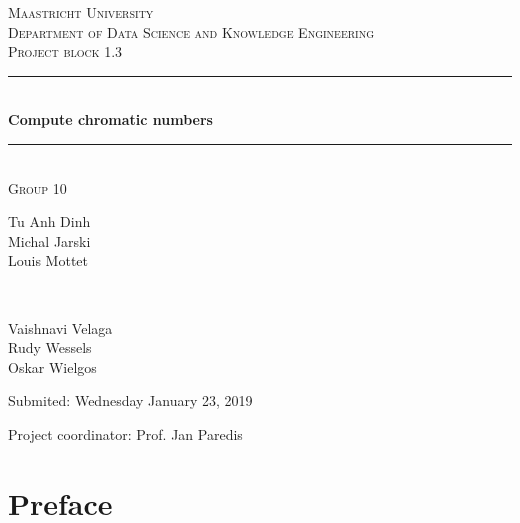 \documentclass[a4paper]{report}
\begin{document}
	\begin{titlepage} 
		\newcommand{\HRule}{\rule{\linewidth}{0.5mm}} 
		
		\center
		
		\textsc{\LARGE Maastricht University}\\[1.5cm]
		
		\textsc{\Large Department of Data Science and Knowledge Engineering}\\[0.5cm] 
		
		\textsc{\large Project block 1.3}\\[0.5cm] 
		
		\HRule\\[0.4cm]
		
		{\huge\bfseries Compute chromatic numbers}\\[0.4cm] 
		
		\HRule\\[1.5cm]
		
		\textsc{\large Group 10}\\[0.5cm]
		
		\begin{minipage}{0.6\textwidth}
			\begin{flushleft}
				Tu Anh Dinh\\Michal Jarski\\Louis Mottet
			\end{flushleft}
		\end{minipage}
		~
		\begin{minipage}{0.3\textwidth}
			\begin{flushleft}
				Vaishnavi Velaga\\Rudy Wessels\\Oskar Wielgos
			\end{flushleft}
		\end{minipage}
	
		 \vspace{1cm}
		Submited: Wednesday January 23, 2019
		\vspace{3cm}
		\begin{flushleft}
			Project coordinator: Prof. Jan Paredis
		\end{flushleft}
		
	\end{titlepage}
	
	\chapter*{Preface}
\end{document}
